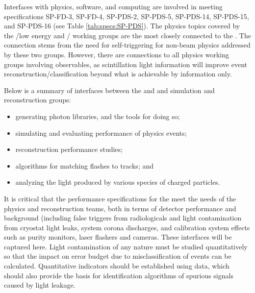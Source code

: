 Interfaces with physics, software, and computing are involved in meeting specifications SP-FD-3, SP-FD-4, SP-PDS-2, SP-PDS-5, 
SP-PDS-14, SP-PDS-15, and SP-PDS-16 (see Table \ref{tab:specs:SP-PDS}). The physics topics covered by the
/low energy and / working groups are the most closely connected to the \single {}. The connection stems from the need for self-triggering for  non-beam physics addressed by these two groups. 
However, there are connections to all physics working groups involving  observables, as scintillation light information will improve event reconstruction/classification beyond what is achievable by  information only. 

Below is a summary of interfaces between the   and  and  simulation and reconstruction groups:

\begin{itemize}
    \item generating photon libraries, and the tools for doing so;
    \item simulating and evaluating performance of physics events;
    \item \single {} reconstruction performance studies;
    \item algorithms for matching flashes to  tracks; and
    \item analyzing the light produced by various species of charged particles.
\end{itemize}

It is critical that the performance specifications for the  meet the needs of the physics and reconstruction teams, both in terms of detector performance and background (including false triggers from radiologicals and light contamination from cryostat light leaks,  system corona discharges, and calibration system effects such as purity monitors, laser flashers and cameras.  These interfaces will be captured here.
Light contamination of any nature must be studied quantitatively so that the impact on error budget due to misclassification of events can be calculated. Quantitative indicators should be established using  data, which should also provide the basis for identification algorithms of spurious signals caused by light leakage. 

